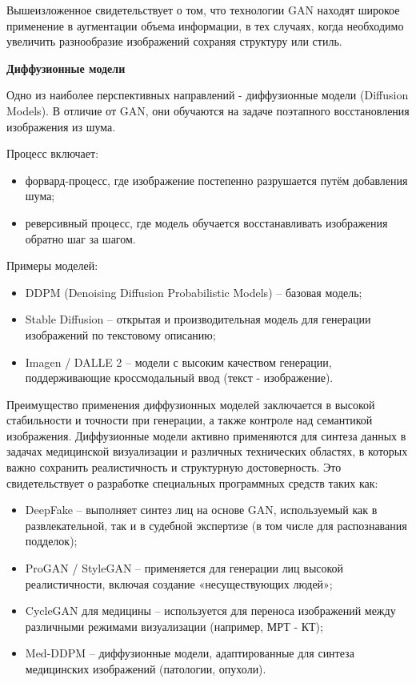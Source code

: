 Вышеизложенное свидетельствует о том, что технологии GAN находят широкое применение в аугментации объема информации, в тех случаях, когда необходимо увеличить разнообразие изображений сохраняя структуру или стиль.

\textbf{Диффузионные модели}

Одно из наиболее перспективных направлений	 - диффузионные модели (Diffusion Models). В отличие от GAN, они обучаются на задаче поэтапного восстановления изображения из шума.

Процесс включает:

\begin{itemize}
	\item форвард-процесс, где изображение постепенно разрушается путём добавления шума;
	\item реверсивный процесс, где модель обучается восстанавливать изображения обратно шаг за шагом.
\end{itemize}
Примеры моделей:

\begin{itemize}
	\item DDPM (Denoising Diffusion Probabilistic Models) – базовая модель;
	\item Stable Diffusion – открытая и производительная модель для генерации изображений по текстовому описанию;
	\item Imagen / DALLE 2 – модели с высоким качеством генерации, поддерживающие кроссмодальный ввод (текст - изображение).
\end{itemize}

Преимущество применения диффузионных моделей заключается в высокой стабильности и точности при генерации, а также контроле над семантикой изображения. Диффузионные модели активно применяются для синтеза данных в задачах медицинской визуализации и различных технических областях, в которых важно сохранить реалистичность и структурную достоверность. Это свидетельствует о разработке специальных программных средств таких как:

\begin{itemize}
	\item DeepFake – выполняет синтез лиц на основе GAN, используемый как в развлекательной, так и в судебной экспертизе (в том числе для распознавания подделок);
	\item ProGAN / StyleGAN – применяется для генерации лиц высокой реалистичности, включая создание «несуществующих людей»;
	\item CycleGAN для медицины – используется для переноса изображений между различными режимами визуализации (например, МРТ - КТ);
	\item Med-DDPM – диффузионные модели, адаптированные для синтеза медицинских изображений (патологии, опухоли).
\end{itemize}

